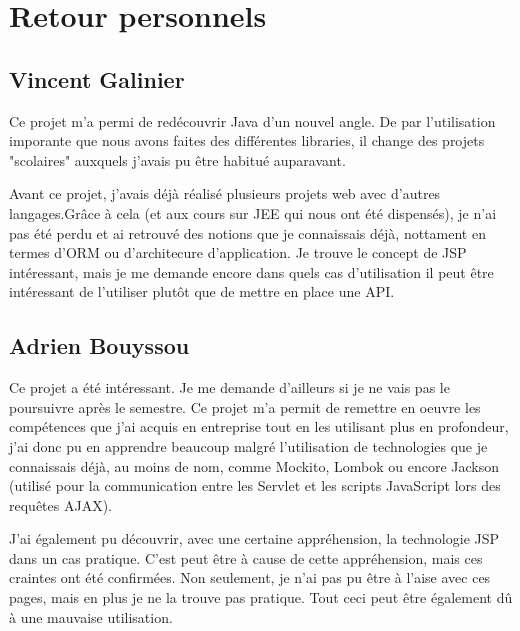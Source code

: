 \documentclass[12pt]{article}		%
\begin{document}
\pagebreak

\section{Retour personnels}

\subsection{Vincent Galinier}

Ce projet m'a permi de redécouvrir Java d'un nouvel angle. De par l'utilisation imporante que nous avons faites des différentes libraries, il change des projets "scolaires" auxquels j'avais pu être habitué auparavant.

    Avant ce projet, j'avais déjà réalisé plusieurs projets web avec d'autres 
langages.Grâce à cela (et aux cours sur JEE qui nous ont été dispensés), je n'ai pas été perdu et ai retrouvé des notions que je connaissais déjà, nottament en termes d'ORM ou d'architecure d'application.
Je trouve le concept de JSP intéressant, mais je me demande encore dans quels cas d'utilisation il peut être intéressant de l'utiliser plutôt que de mettre en place une API.

\subsection{Adrien Bouyssou}

Ce projet a été intéressant. Je me demande d'ailleurs si je ne vais pas le poursuivre après le semestre. Ce projet m'a permit de remettre en oeuvre les compétences que j'ai acquis en entreprise tout en les utilisant plus en profondeur, j'ai donc pu en apprendre beaucoup malgré l'utilisation de technologies que je connaissais déjà, au moins de nom, comme Mockito, Lombok ou encore Jackson (utilisé pour la communication entre les Servlet et les scripts JavaScript lors des requêtes AJAX).

J'ai également pu découvrir, avec une certaine appréhension, la technologie JSP dans un cas pratique. C'est peut être à cause de cette appréhension, mais ces craintes ont été confirmées. Non seulement, je n'ai pas pu être à l'aise avec ces pages, mais en plus je ne la trouve pas pratique. Tout ceci peut être également dû à une mauvaise utilisation.
\end{document}
